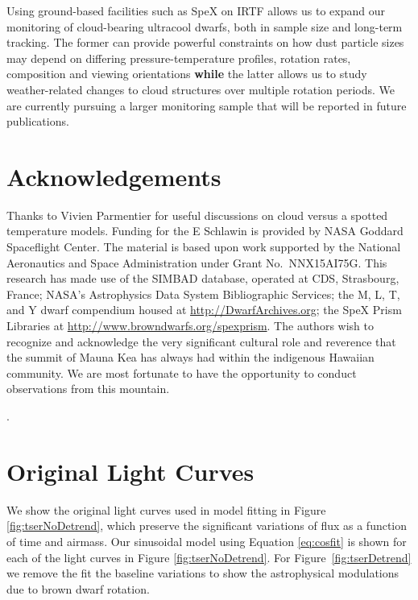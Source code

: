 \documentclass[twocolumn]{aastex6}
\begin{document}
Using ground-based facilities such as SpeX on IRTF allows us to expand our monitoring of cloud-bearing ultracool dwarfs, both in sample size and long-term tracking. The former can provide powerful constraints on how dust particle sizes may depend on differing pressure-temperature profiles, rotation rates, composition and viewing orientations \textbf{while} the latter allows us to study weather-related changes to cloud structures over multiple rotation periods. We are currently pursuing a larger monitoring sample that will be reported in future publications.


\section{Acknowledgements}
Thanks to Vivien Parmentier for useful discussions on cloud versus a spotted temperature models.
Funding for the E Schlawin is provided by NASA Goddard Spaceflight Center.
The material is based upon work supported by
the National Aeronautics and Space Administration under
Grant No.~NNX15AI75G. 
This research has made
use of the SIMBAD database, operated at CDS, Strasbourg,
France; NASA's Astrophysics Data System Bibliographic
Services; the M, L, T, and Y dwarf compendium
housed at \url{http://DwarfArchives.org}; the SpeX Prism
Libraries at \url{http://www.browndwarfs.org/spexprism}.
The authors wish to recognize and acknowledge the very significant cultural role and reverence that the summit of Mauna Kea has always had within the indigenous Hawaiian community. We are most fortunate to have the opportunity to conduct observations from this mountain.

\acknowledgments

.

\textbf{}

\appendix

\section{Original Light Curves}

We show the original light curves used in model fitting in Figure \ref{fig:tserNoDetrend}, which preserve the significant variations of flux as a function of time and airmass.
Our sinusoidal model using Equation \ref{eq:cosfit} is shown for each of the light curves in Figure \ref{fig:tserNoDetrend}.
For Figure~\ref{fig:tserDetrend} we remove the fit the baseline variations to show the astrophysical modulations due to brown dwarf rotation.
\end{document}
